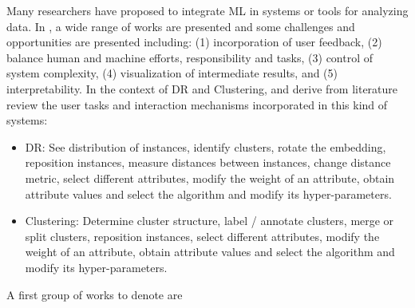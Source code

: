 Many researchers have proposed to integrate ML in systems or tools for analyzing data. In \cite{Endert2017b}, a wide range of works are presented and some challenges and opportunities are presented including: (1) incorporation of user feedback, (2) balance human and machine efforts, responsibility and tasks, (3) control of system complexity, (4) visualization of intermediate results, and (5) interpretability. In the context of DR and Clustering, \cite{Wenskovitch2018} and \cite{Sacha2017g} derive from literature review the user tasks and interaction mechanisms incorporated in this kind of systems:

\begin{itemize}
\item DR: See distribution of instances, identify clusters, rotate the embedding, reposition instances, measure distances between instances, change distance metric, select different attributes, modify the weight of an attribute, obtain attribute values and select the algorithm and modify its hyper-parameters.
\item Clustering: Determine cluster structure, label / annotate clusters, merge or split clusters, reposition instances, select different attributes, modify the weight of an attribute, obtain attribute values and select the algorithm and modify its hyper-parameters.
\end{itemize}

A first group of works to denote are 